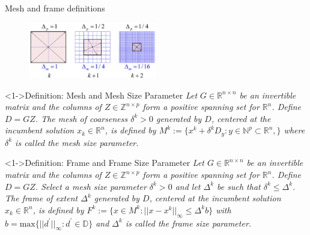 \documentclass[8pt]{beamer}
\begin{document}
\begin{frame}{Mesh and frame definitions}

  \begin{center}
    \begin{figure}[H]
    \includegraphics[width=0.5\textwidth]
    {Figures/Poll-Mesh.png}
    \end{figure}
  \end{center}

  \begin{block}<1->{Definition: Mesh and Mesh Size Parameter}
    {\it Let $G \in \mathbb{R}^{n\times n}$ be an invertible matrix and the columns of $Z \in \mathbb{Z}^{n \times p}$ form a positive spanning set for $\mathbb{R}^n$. Define $D = GZ$. The mesh of coarseness $\delta^{k} > 0$ generated by $D$, centered at the incumbent solution $x_{k} \in \mathbb{R}^n$, is defined by
    $M^{k} := \{ x^{k} + \delta^{k}D_{y} : y \in \mathbb{N}^{p} \subset \mathbb{R}^{n}, \}$
    where $\delta^{k}$ is called the mesh size parameter.}
  \end{block}

  \begin{block}<1->{Definition: Frame and Frame Size Parameter}
    {\it Let $G \in \mathbb{R}^{n\times n}$ be an invertible matrix and the columns of $Z \in \mathbb{Z}^{n \times p}$ form a positive spanning set for $\mathbb{R}^n$. Define $D = GZ$. Select a mesh size parameter $\delta^{k} > 0$ and let $\Delta^{k}$ be such that $\delta^{k} \leq \Delta^{k}$. The frame of extent $\Delta^{k}$ generated by $D$, centered at the incumbent solution $x_{k} \in \mathbb{R}^n$, is defined by
    $F^{k} := \{ x \in M^{k} : ||x-x^{k}||_{\infty} \leq \Delta^{k}b \}$
    with $b = \text{max}\{ ||d^{\prime}||_{\infty} : d^{\prime} \in \mathbb{D} \}$ and $\Delta^{k}$ is called the frame size parameter.}
  \end{block}
\end{frame}
\end{document}
